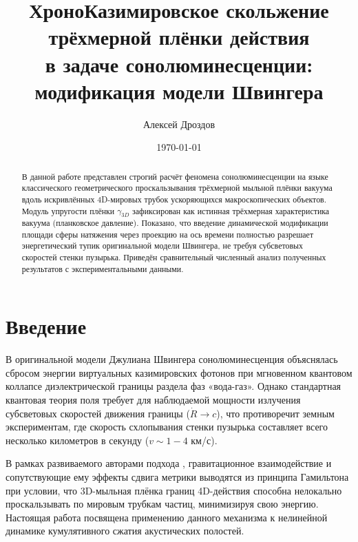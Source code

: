 \documentclass[twocolumn,PRL,amsmath,amssymb]{revtex4-1}
\begin{document}
\title{ХроноКазимировское скольжение трёхмерной плёнки действия\\в задаче сонолюминесценции: модификация модели Швингера}

\author{Алексей Дроздов}

\date{\today}

\begin{abstract}
В данной работе представлен строгий расчёт феномена сонолюминесценции на языке классического геометрического проскальзывания трёхмерной мыльной плёнки вакуума вдоль искривлённых 4D-мировых трубок ускоряющихся макроскопических объектов. Модуль упругости плёнки $\gamma_{3D}$ зафиксирован как истинная трёхмерная характеристика вакуума (планковское давление). Показано, что введение динамической модификации площади сферы натяжения через проекцию на ось времени полностью разрешает энергетический тупик оригинальной модели Швингера, не требуя субсветовых скоростей стенки пузырька. Приведён сравнительный численный анализ полученных результатов с экспериментальными данными.
\end{abstract}

\maketitle

\section{Введение}
В оригинальной модели Джулиана Швингера \cite{Schwinger1992} сонолюминесценция объяснялась сбросом энергии виртуальных казимировских фотонов при мгновенном квантовом коллапсе диэлектрической границы раздела фаз «вода-газ». Однако стандартная квантовая теория поля требует для наблюдаемой мощности излучения субсветовых скоростей движения границы ($\dot{R} \rightarrow c$), что противоречит земным экспериментам, где скорость схлопывания стенки пузырька составляет всего несколько километров в секунду ($v \sim 1-4$ км/с).

В рамках развиваемого авторами подхода \cite{PrevWork}, гравитационное взаимодействие и сопутствующие ему эффекты сдвига метрики выводятся из принципа Гамильтона при условии, что 3D-мыльная плёнка границ 4D-действия способна нелокально проскальзывать по мировым трубкам частиц, минимизируя свою энергию. Настоящая работа посвящена применению данного механизма к нелинейной динамике кумулятивного сжатия акустических полостей.
\end{document}
